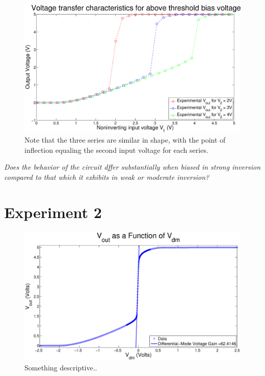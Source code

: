 \documentclass{article}
\begin{document}
\begin{figure}[H]
\centering
\includegraphics[width=\linewidth]{../Figures/Exp1P3.eps}
\caption{Note that the three series are similar in shape, with the point of inflection equaling the second input voltage for each series.}
\label{fig:exp1p3}
\end{figure}


\textit{Does the behavior of the circuit dffer substantially when biased in strong inversion compared to that which it exhibits in
weak or moderate inversion?}



\section*{Experiment 2}

\begin{figure}[H]
\centering
\includegraphics[width=\linewidth]{../Figures/Exp2P1.eps}
\caption{Something descriptive..}
\label{fig:exp2p1}
\end{figure}
\end{document}
